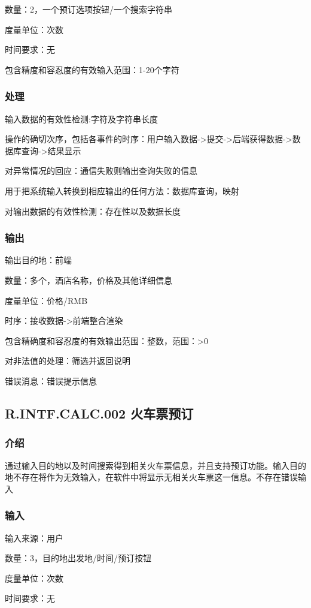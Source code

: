 		数量：2，一个预订选项按钮/一个搜索字符串

		度量单位：次数

		时间要求：无

		包含精度和容忍度的有效输入范围：1-20个字符

\subsubsection{处理}
	输入数据的有效性检测:字符及字符串长度

	操作的确切次序，包括各事件的时序：用户输入数据->提交->后端获得数据->数据库查询->结果显示

	对异常情况的回应：通信失败则输出查询失败的信息

	用于把系统输入转换到相应输出的任何方法：数据库查询，映射

	对输出数据的有效性检测：存在性以及数据长度

\subsubsection{输出}
		输出目的地：前端

		数量：多个，酒店名称，价格及其他详细信息

		度量单位：价格/RMB

		时序：接收数据->前端整合渲染

		包含精确度和容忍度的有效输出范围：整数，范围：>0

		对非法值的处理：筛选并返回说明

		错误消息：错误提示信息



\subsection{R.INTF.CALC.002 火车票预订}
\subsubsection{介绍}
通过输入目的地以及时间搜索得到相关火车票信息，并且支持预订功能。输入目的地不存在将作为无效输入，在软件中将显示无相关火车票这一信息。不存在错误输入
\subsubsection{输入}
		输入来源：用户

		数量：3，目的地出发地/时间/预订按钮

		度量单位：次数

		时间要求：无

